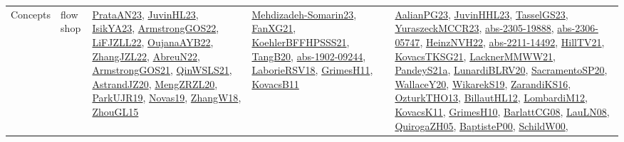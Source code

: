 {\begin{longtable}{lp{3cm}>{\raggedright}p{6cm}>{\raggedright}p{6cm}p{8cm}}
Concepts & flow shop & \href{articles/PrataAN23.pdf}{PrataAN23}\cite{PrataAN23}, \href{papers/JuvinHL23.pdf}{JuvinHL23}\cite{JuvinHL23}, \href{articles/IsikYA23.pdf}{IsikYA23}\cite{IsikYA23}, \href{papers/ArmstrongGOS22.pdf}{ArmstrongGOS22}\cite{ArmstrongGOS22}, \href{papers/LiFJZLL22.pdf}{LiFJZLL22}\cite{LiFJZLL22}, \href{papers/OujanaAYB22.pdf}{OujanaAYB22}\cite{OujanaAYB22}, \href{papers/ZhangJZL22.pdf}{ZhangJZL22}\cite{ZhangJZL22}, \href{articles/AbreuN22.pdf}{AbreuN22}\cite{AbreuN22}, \href{papers/ArmstrongGOS21.pdf}{ArmstrongGOS21}\cite{ArmstrongGOS21}, \href{articles/QinWSLS21.pdf}{QinWSLS21}\cite{QinWSLS21}, \href{articles/AstrandJZ20.pdf}{AstrandJZ20}\cite{AstrandJZ20}, \href{articles/MengZRZL20.pdf}{MengZRZL20}\cite{MengZRZL20}, \href{papers/ParkUJR19.pdf}{ParkUJR19}\cite{ParkUJR19}, \href{articles/Novas19.pdf}{Novas19}\cite{Novas19}, \href{articles/ZhangW18.pdf}{ZhangW18}\cite{ZhangW18}, \href{papers/ZhouGL15.pdf}{ZhouGL15}\cite{ZhouGL15} & \href{papers/Mehdizadeh-Somarin23.pdf}{Mehdizadeh-Somarin23}\cite{Mehdizadeh-Somarin23}, \href{articles/FanXG21.pdf}{FanXG21}\cite{FanXG21}, \href{articles/KoehlerBFFHPSSS21.pdf}{KoehlerBFFHPSSS21}\cite{KoehlerBFFHPSSS21}, \href{papers/TangB20.pdf}{TangB20}\cite{TangB20}, \href{articles/abs-1902-09244.pdf}{abs-1902-09244}\cite{abs-1902-09244}, \href{articles/LaborieRSV18.pdf}{LaborieRSV18}\cite{LaborieRSV18}, \href{papers/GrimesH11.pdf}{GrimesH11}\cite{GrimesH11}, \href{articles/KovacsB11.pdf}{KovacsB11}\cite{KovacsB11} & \href{papers/AalianPG23.pdf}{AalianPG23}\cite{AalianPG23}, \href{papers/JuvinHHL23.pdf}{JuvinHHL23}\cite{JuvinHHL23}, \href{papers/TasselGS23.pdf}{TasselGS23}\cite{TasselGS23}, \href{articles/YuraszeckMCCR23.pdf}{YuraszeckMCCR23}\cite{YuraszeckMCCR23}, \href{articles/abs-2305-19888.pdf}{abs-2305-19888}\cite{abs-2305-19888}, \href{articles/abs-2306-05747.pdf}{abs-2306-05747}\cite{abs-2306-05747}, \href{articles/HeinzNVH22.pdf}{HeinzNVH22}\cite{HeinzNVH22}, \href{articles/abs-2211-14492.pdf}{abs-2211-14492}\cite{abs-2211-14492}, \href{papers/HillTV21.pdf}{HillTV21}\cite{HillTV21}, \href{papers/KovacsTKSG21.pdf}{KovacsTKSG21}\cite{KovacsTKSG21}, \href{papers/LacknerMMWW21.pdf}{LacknerMMWW21}\cite{LacknerMMWW21}, \href{articles/PandeyS21a.pdf}{PandeyS21a}\cite{PandeyS21a}, \href{articles/LunardiBLRV20.pdf}{LunardiBLRV20}\cite{LunardiBLRV20}, \href{articles/SacramentoSP20.pdf}{SacramentoSP20}\cite{SacramentoSP20}, \href{articles/WallaceY20.pdf}{WallaceY20}\cite{WallaceY20}, \href{articles/WikarekS19.pdf}{WikarekS19}\cite{WikarekS19}, \href{articles/ZarandiKS16.pdf}{ZarandiKS16}\cite{ZarandiKS16}, \href{articles/OzturkTHO13.pdf}{OzturkTHO13}\cite{OzturkTHO13}, \href{papers/BillautHL12.pdf}{BillautHL12}\cite{BillautHL12}, \href{articles/LombardiM12.pdf}{LombardiM12}\cite{LombardiM12}, \href{articles/KovacsK11.pdf}{KovacsK11}\cite{KovacsK11}, \href{papers/GrimesH10.pdf}{GrimesH10}\cite{GrimesH10}, \href{papers/BarlattCG08.pdf}{BarlattCG08}\cite{BarlattCG08}, \href{papers/LauLN08.pdf}{LauLN08}\cite{LauLN08}, \href{papers/QuirogaZH05.pdf}{QuirogaZH05}\cite{QuirogaZH05}, \href{articles/BaptisteP00.pdf}{BaptisteP00}\cite{BaptisteP00}, \href{articles/SchildW00.pdf}{SchildW00}\cite{SchildW00}, 
\end{longtable}}
